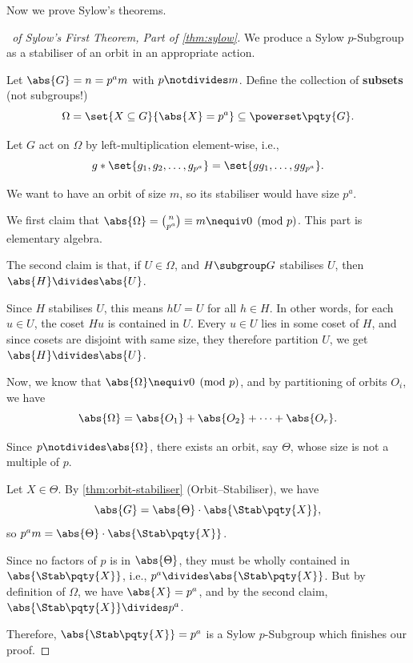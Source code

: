 Now we prove Sylow's theorems.

\begin{proof}[\proofname\ of Sylow's First Theorem, Part of \autoref{thm:sylow}]
    We produce a Sylow \(p\)-Subgroup as a stabiliser of an orbit in an appropriate action.
    
    Let \(\abs{G} = n = p^a m\) with \(p \notdivides m\). Define the collection of \textbf{subsets} (not subgroups!)
    \[
        \Omega = \set{X \subseteq G}{\abs{X} = p^a} \subseteq \powerset\pqty{G}.
    \]

    Let \(G\) act on \(\Omega\) by left-multiplication element-wise, i.e.,
    \[
        g \ast \set{g_1, g_2, \ldots, g_{p^a}} = \set{g g_1, \ldots, g g_{p^a}}.
    \]

    We want to have an orbit of size \(m\), so its stabiliser would have size \(p^a\).

    We first claim that \(\abs{\Omega} = \binom{n}{p^a} \equiv m \nequiv 0 \pmod{p}\). This part is elementary algebra.

    The second claim is that, if \(U \in \Omega\), and \(H \subgroup G\) stabilises \(U\), then \(\abs{H} \divides \abs{U}\).
    
    Since \(H\) stabilises \(U\), this means \(hU = U\) for all \(h \in H\). In other words, for each \(u \in U\), the coset \(Hu\) is contained in \(U\). Every \(u \in U\) lies in some coset of \(H\), and since cosets are disjoint with same size, they therefore partition \(U\), we get \(\abs{H} \divides \abs{U}\).

    Now, we know that \(\abs{\Omega} \nequiv 0 \pmod{p}\), and by partitioning of orbits \(O_i\), we have
    \[
        \abs{\Omega} = \abs{O_1} + \abs{O_2} + \cdots + \abs{O_r}.
    \]

    Since \(p \notdivides \abs{\Omega}\), there exists an orbit, say \(\Theta\), whose size is not a multiple of \(p\).

    Let \(X \in \Theta\). By \autoref{thm:orbit-stabiliser} (Orbit--Stabiliser), we have
    \[
        \abs{G} = \abs{\Theta} \cdot \abs{\Stab\pqty{X}},
    \]
    so \(p^a m = \abs{\Theta} \cdot \abs{\Stab\pqty{X}}\).

    Since no factors of \(p\) is in \(\abs{\Theta}\), they must be wholly contained in \(\abs{\Stab\pqty{X}}\), i.e., \(p^a \divides \abs{\Stab\pqty{X}}\). But by definition of \(\Omega\), we have \(\abs{X} = p^a\), and by the second claim, \(\abs{\Stab\pqty{X}} \divides p^a\).

    Therefore, \(\abs{\Stab\pqty{X}} = p^a\) is a Sylow \(p\)-Subgroup which finishes our proof.
\end{proof}

